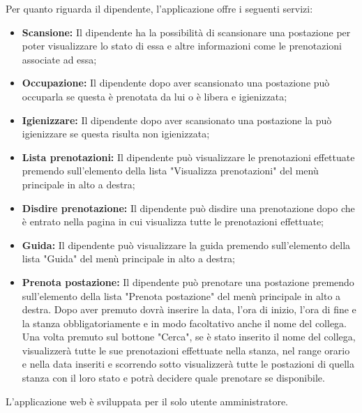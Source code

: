Per quanto riguarda il dipendente, l'applicazione offre i seguenti servizi:
\begin{itemize}
	\item \textbf{Scansione:} Il dipendente ha la possibilità di scansionare una postazione per poter visualizzare lo stato di essa e altre informazioni come le prenotazioni associate ad essa; \\
	\item \textbf{Occupazione:} Il dipendente dopo aver scansionato una postazione può occuparla se questa è prenotata da lui o è libera e igienizzata; \\
	\item \textbf{Igienizzare:} Il dipendente dopo aver scansionato una postazione la può igienizzare se questa risulta non igienizzata; \\
	\item \textbf{Lista prenotazioni:} Il dipendente può visualizzare le prenotazioni effettuate premendo sull'elemento della lista "Visualizza prenotazioni" del menù principale in alto a destra; \\
	\item \textbf{Disdire prenotazione:} Il dipendente può disdire una prenotazione dopo che è entrato nella pagina in cui visualizza tutte le prenotazioni effettuate; \\
	\item \textbf{Guida:} Il dipendente può visualizzare la guida premendo sull'elemento della lista "Guida" del menù principale in alto a destra; \\
	\item \textbf{Prenota postazione:} Il dipendente può prenotare una postazione premendo sull'elemento della lista "Prenota postazione" del menù principale in alto a destra.
	Dopo aver premuto dovrà inserire la data, l'ora di inizio, l'ora di fine e la stanza obbligatoriamente e in modo facoltativo anche il nome del collega.
	Una volta premuto sul bottone "Cerca", se è stato inserito il nome del collega, visualizzerà tutte le sue prenotazioni effettuate nella stanza, nel range orario e nella data inseriti e scorrendo sotto visualizzerà tutte le postazioni di quella stanza con il loro stato e potrà decidere quale prenotare se disponibile. \\	
\end{itemize}


L'applicazione web è sviluppata per il solo utente amministratore.

